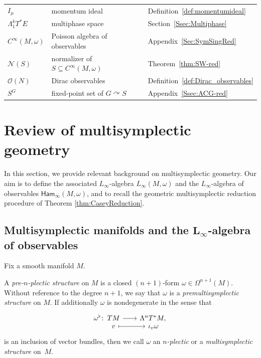 \documentclass[10pt,a4paper]{amsart}
\numberwithin{equation}{section}
\newcommand{\Ham}{\mathsf{Ham}}
\renewcommand{\subset}{\subseteq}
\newcommand{\morphism}[5]{%
  \begin{tikzcd}[
    column sep=2em,
    row sep=-.5ex,
    ampersand replacement=\&
  ]
  #1\colon~ \&[-3em]
  #2\vphantom{#3} \arrow[r] \&
  #3\vphantom{#2} \\
  \&
  #4\vphantom{#5} \arrow[r,mapsto] \&
  #5\vphantom{#4}
  \end{tikzcd}%
}
\begin{document}
\begin{table}[t]
\begin{tabular}{lll}
		$I_\mu$			&momentum ideal				&Definition~\ref{def:momentumideal}		\\
		$\Lambda^k_1T^*E$	&multiphase space			&Section~\ref{Ssec:Multiphase}		\\
				$C^\infty(M,\omega)$	&Poisson algebra of observables	&Appendix~\ref{Sec:SymSingRed}		\\
		$\mathcal{N}(S)$	&normalizer of $S\subset C^\infty(M,\omega)$	&Theorem~\ref{thm:SW-red}	\\
		$\mathcal{O}(N)$	&Dirac observables			&Definition~\ref{def:Dirac_observables}			\\
		$S^G$			&fixed-point set of $G\curvearrowright S$	&Appendix~\ref{Ssec:ACG-red}		\\
	\end{tabular}
\end{table}

\section{Review of multisymplectic geometry}\label{Sec:MultiReview}

In this section, we provide relevant background on multisymplectic geometry. Our aim is to define the associated $L_\infty$-algebra $L_\infty(M,\omega)$ and the $L_\infty$-algebra of observables $\Ham_\infty(M,\omega)$, and to recall the geometric multisymplectic reduction procedure of Theorem \ref{thm:CaseyReduction}.


\subsection[Multisymplectic manifolds and the L\_infty-algebra of observables]{Multisymplectic manifolds and the $\boldsymbol{L_\infty}$-algebra of observables}%

Fix a smooth manifold $M$.

\begin{Definition}\label{def:MultisymplecticManifold}
	A \emph{pre-$n$-plectic structure} on $M$ is a closed $(n+1)$-form $\omega\in\Omega^{n+1}(M)$. Without reference to the degree $n+1$, we say that $\omega$ is a \emph{premultisymplectic structure} on $M$. If additionally $\omega$ is nondegenerate in the sense that
	\begin{displaymath}
		\morphism{\omega^\flat}
		{TM}{\Lambda^nT^*M,}
		{v}{\iota_v\omega}
	\end{displaymath}
	is an inclusion of vector bundles, then we call $\omega$ an \emph{$n$-plectic} or a \emph{multisymplectic structure} on~$M$.
\end{Definition}
\end{document}
